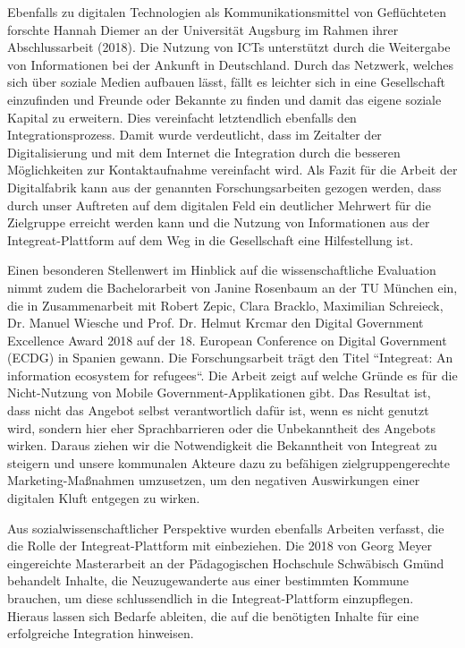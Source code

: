 \documentclass[12pt, a4paper]{article} %
\begin{document}
Ebenfalls zu digitalen Technologien als Kommunikationsmittel von
Geflüchteten forschte Hannah Diemer an der Universität Augsburg im
Rahmen ihrer Abschlussarbeit (2018). Die Nutzung von ICTs unterstützt
durch die Weitergabe von Informationen bei der Ankunft in Deutschland.
Durch das Netzwerk, welches sich über soziale Medien aufbauen lässt,
fällt es leichter sich in eine Gesellschaft einzufinden und Freunde oder
Bekannte zu finden und damit das eigene soziale Kapital zu erweitern.
Dies vereinfacht letztendlich ebenfalls den Integrationsprozess. Damit
wurde verdeutlicht, dass im Zeitalter der Digitalisierung und mit dem
Internet die Integration durch die besseren Möglichkeiten zur
Kontaktaufnahme vereinfacht wird. Als Fazit für die Arbeit der
Digitalfabrik kann aus der genannten Forschungsarbeiten gezogen werden,
dass durch unser Auftreten auf dem digitalen Feld ein deutlicher
Mehrwert für die Zielgruppe erreicht werden kann und die Nutzung von
Informationen aus der Integreat-Plattform auf dem Weg in die
Gesellschaft eine Hilfestellung ist.

Einen besonderen Stellenwert im Hinblick auf die wissenschaftliche
Evaluation nimmt zudem die Bachelorarbeit von Janine Rosenbaum an der TU
München ein, die in Zusammenarbeit mit Robert Zepic, Clara Bracklo,
Maximilian Schreieck, Dr. Manuel Wiesche und Prof. Dr. Helmut Krcmar den
Digital Government Excellence Award 2018 auf der 18. European Conference
on Digital Government (ECDG) in Spanien gewann. Die Forschungsarbeit
trägt den Titel “Integreat: An information ecosystem for refugees“. Die
Arbeit zeigt auf welche Gründe es für die Nicht-Nutzung von Mobile
Government-Applikationen gibt. Das Resultat ist, dass nicht das Angebot
selbst verantwortlich dafür ist, wenn es nicht genutzt wird, sondern
hier eher Sprachbarrieren oder die Unbekanntheit des Angebots wirken.
Daraus ziehen wir die Notwendigkeit die Bekanntheit von Integreat zu
steigern und unsere kommunalen Akteure dazu zu befähigen
zielgruppengerechte Marketing-Maßnahmen umzusetzen, um den negativen
Auswirkungen einer digitalen Kluft entgegen zu wirken.

Aus sozialwissenschaftlicher Perspektive wurden ebenfalls Arbeiten
verfasst, die die Rolle der Integreat-Plattform mit einbeziehen. Die
2018 von Georg Meyer eingereichte Masterarbeit an der Pädagogischen
Hochschule Schwäbisch Gmünd behandelt Inhalte, die Neuzugewanderte aus
einer bestimmten Kommune brauchen, um diese schlussendlich in die
Integreat-Plattform einzupflegen. Hieraus lassen sich Bedarfe ableiten,
die auf die benötigten Inhalte für eine erfolgreiche Integration
hinweisen.
\end{document}
